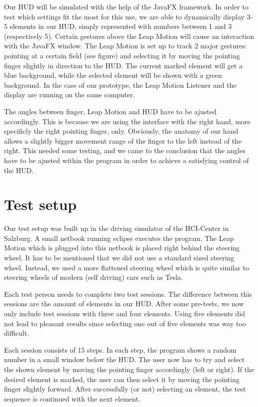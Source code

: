 \documentclass{sigchi-ext}
\begin{document}
Our HUD will be simulated with the help of the JavaFX framework. In order to test which settings fit the most for this use,
we are able to dynamically display 3-5 elements in our HUD, simply represented with numbers between 1 and 3 (respectively 5).
Certain gestures above the Leap Motion will cause an interaction with the JavaFX window.
The Leap Motion is set up to track 2 major gestures: pointing at a certain field (see figure)
and selecting it by moving the pointing finger slightly in direction to the HUD. The current marked element will get a blue background, while the selected element will be shown with a green background. In the case of our prototype,
the Leap Motion Listener and the display are running on the same computer.

The angles between finger, Leap Motion and HUD have to be ajusted accordingly. This is because we are using the
interface with the right hand, more specificly the right pointing finger, only. Obviously, the anatomy of our hand
allows a slightly bigger movement range of the finger to the left instead of the right. This needed some testing, and we came to
the conclusion that the angles have to be ajusted within the program in order to achieve a satisfying control of the HUD.

\section{Test setup}
Our test setup was built up in the driving simulator of the HCI-Center in Salzburg. A small netbook running eclipse executes the program. The Leap Motion which is plugged into this netbook is placed right behind the steering wheel. It has to be mentioned that we did not use a standard sized steering wheel. Instead, we used a more flattened steering wheel which is quite similar to steering wheels of modern (self driving) cars such as Tesla.

Each test person needs to complete two test sessions. The difference between this sessions are the amount of elements in our HUD. After some pre-tests, we now only include test sessions with three and four elements. Using five elements did not lead to pleasant results since selecting one out of five elements was way too difficult.

Each session consists of 15 steps. In each step, the program shows a random number in a small window below the HUD. The user  now has to try and select the shown element by moving the pointing finger accordingly (left or right). If the desired element is marked, the user can then select it by moving the pointing finger slightly forward. After successfully (or not) selecting an element, the test sequence is continued with the next element.
\end{document}
